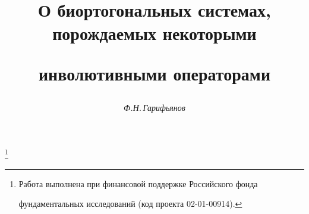 

 






\newcommand{\re}{\operatorname{Re}} 


\newcommand{\im}{\operatorname{Im}} 


\newcommand{\ch}{\operatorname{ch}} 


\newcommand{\sh}{\operatorname{sh}} 


\newcommand{\tts}[1]{}  


 


 




\setcounter{page}{26} 












 


\author{\it Ф.Н.\,Гарифьянов} 




\title{О биортогональных системах, порождаемых некоторыми  


инволютивными операторами} 


\thanks{Работа выполнена при финансовой поддержке Российского фонда


фундаментальных исследований (код проекта 02-01-00914).} 


 


\date{} 




\pagestyle{plain} %


